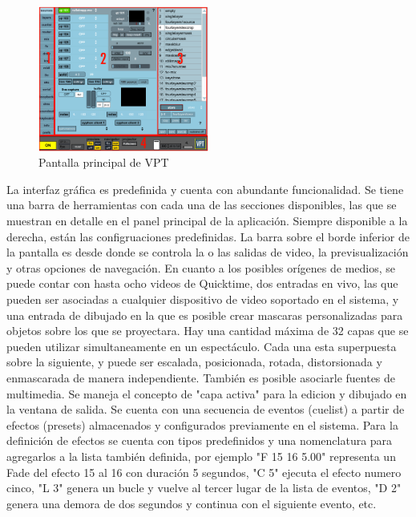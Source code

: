 \begin{figure}[H]
  \centering
    \includegraphics[width=0.5\textwidth]{./Cap3_aplicaciones/apps-vpt.png}
  \caption{Pantalla principal de VPT}
  \label{fig:Apps-VPT}
\end{figure}

La interfaz gráfica es predefinida y cuenta con abundante funcionalidad. Se tiene una barra de herramientas con cada una de las secciones disponibles, las que se muestran en detalle en el panel principal de la aplicación. Siempre disponible a la derecha, están las configruaciones predefinidas. La barra sobre el borde inferior de la pantalla es desde donde se controla la o las salidas de video, la previsualización y otras opciones de navegación.
En cuanto a los posibles orígenes de medios, se puede contar con hasta ocho videos de Quicktime, dos entradas en vivo, las que pueden ser asociadas a cualquier dispositivo de video soportado en el sistema, y una entrada de dibujado en la que es posible crear mascaras personalizadas para objetos sobre los que se proyectara.
Hay una cantidad máxima de 32 capas que se pueden utilizar simultaneamente en un espectáculo. Cada una esta superpuesta sobre la siguiente, y puede ser escalada, posicionada, rotada, distorsionada y enmascarada de manera independiente. También es posible asociarle fuentes de multimedia. Se maneja el concepto de "capa activa" para la edicion y dibujado en la ventana de salida.
Se cuenta con una secuencia de eventos (cuelist) a partir de efectos (presets) almacenados y configurados previamente en el sistema. Para la definición de efectos se cuenta con tipos predefinidos y una nomenclatura para agregarlos a la lista también definida, por ejemplo "F 15 16 5.00" representa un Fade del efecto 15 al 16 con duración 5 segundos, "C 5" ejecuta el efecto numero cinco, "L 3" genera un bucle y vuelve al tercer lugar de la lista de eventos, "D 2" genera una demora de dos segundos y continua con el siguiente evento, etc.

